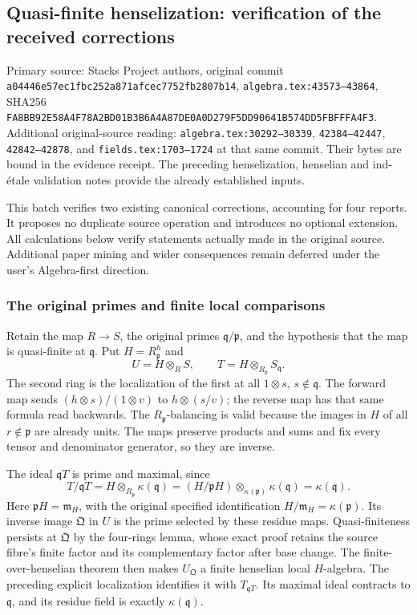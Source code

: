 \subsection{Quasi-finite henselization: verification of the received corrections}\label{algebra-proof-061-quasi-finite-henselization-verification-of-the-received-corrections}

Primary source: Stacks Project authors, original commit \texttt{a04446e57ec1fbc252a871afcec7752fb2807b14}, \texttt{algebra.tex:43573–43864}, SHA256 \texttt{FA8BB92E58A4F78A2BD01B3B6A4A87DE0A0D279F5DD90641B574DD5FBFFFA4F3}. Additional original-source reading: \texttt{algebra.tex:30292–30339}, \texttt{42384–42447}, \texttt{42842–42878}, and \texttt{fields.tex:1703–1724} at that same commit. Their bytes are bound in the evidence receipt. The preceding henselization, henselian and ind-étale validation notes provide the already established inputs.

This batch verifies two existing canonical corrections, accounting for four reports. It proposes no duplicate source operation and introduces no optional extension. All calculations below verify statements actually made in the original source. Additional paper mining and wider consequences remain deferred under the user's Algebra-first direction.

\subsubsection{The original primes and finite local comparisons}\label{algebra-proof-061-the-original-primes-and-finite-local-comparisons}

Retain the map \(R\to S\), the original primes \(\mathfrak q/\mathfrak p\), and the hypothesis that the map is quasi-finite at \(\mathfrak q\). Put \(H=R_{\mathfrak p}^h\) and \[
 U=H\otimes_R S,\qquad
 T=H\otimes_{R_{\mathfrak p}}S_{\mathfrak q}.
\] The second ring is the localization of the first at all \(1\otimes s\), \(s\notin\mathfrak q\). The forward map sends \((h\otimes s)/(1\otimes v)\) to \(h\otimes(s/v)\); the reverse map has that same formula read backwards. The \(R_{\mathfrak p}\)-balancing is valid because the images in \(H\) of all \(r\notin\mathfrak p\) are already units. The maps preserve products and sums and fix every tensor and denominator generator, so they are inverse.

The ideal \(\mathfrak qT\) is prime and maximal, since \[
 T/\mathfrak qT
 =H\otimes_{R_{\mathfrak p}}\kappa(\mathfrak q)
 =(H/\mathfrak pH)\otimes_{\kappa(\mathfrak p)}\kappa(\mathfrak q)
 =\kappa(\mathfrak q).
\] Here \(\mathfrak pH=\mathfrak m_H\), with the original specified identification \(H/\mathfrak m_H=\kappa(\mathfrak p)\). Its inverse image \(\mathfrak Q\) in \(U\) is the prime selected by these residue maps. Quasi-finiteness persists at \(\mathfrak Q\) by the four-rings lemma, whose exact proof retains the source fibre's finite factor and its complementary factor after base change. The finite-over-henselian theorem then makes \(U_{\mathfrak Q}\) a finite henselian local \(H\)-algebra. The preceding explicit localization identifies it with \(T_{\mathfrak qT}\). Its maximal ideal contracts to \(\mathfrak q\), and its residue field is exactly \(\kappa(\mathfrak q)\).

